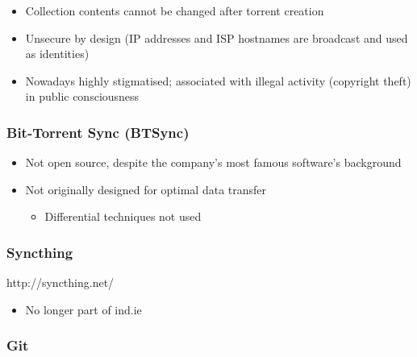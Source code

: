 \documentclass[12pt,a4paper,]{book}
\begin{document}
\begin{itemize}
\itemsep1pt\parskip0pt
\item
  Collection contents cannot be changed after torrent creation
\item
  Unsecure by design (IP addresses and ISP hostnames are broadcast and
  used as identities)
\item
  Nowadays highly stigmatised; associated with illegal activity
  (copyright theft) in public consciousness
\end{itemize}

\subsubsection{Bit-Torrent Sync (BTSync)}\label{bit-torrent-sync-btsync}

\begin{itemize}
\itemsep1pt\parskip0pt
\item
  Not open source, despite the company's most famous software's
  background
\item
  Not originally designed for optimal data transfer

  \begin{itemize}
  \itemsep1pt\parskip0pt
  \item
    Differential techniques not used
  \end{itemize}
\end{itemize}

\subsubsection{Syncthing}\label{syncthing}

http://syncthing.net/

\begin{itemize}
\itemsep1pt\parskip0pt
\item
  No longer part of ind.ie
\end{itemize}

\subsubsection{Git}\label{git}
\end{document}

